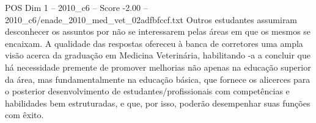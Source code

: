 \begin{textsample}{POS Dim 1 – 2010\_c6 – Score -2.00 – 2010\_c6/enade\_2010\_med\_vet\_02adfbfccf.txt}
Outros estudantes assumiram desconhecer os assuntos por não se interessarem pelas áreas em que os mesmos se encaixam.
A qualidade das respostas ofereceu à banca de corretores uma ampla visão acerca da graduação em Medicina Veterinária, habilitando -a a concluir que há necessidade premente de promover melhorias não apenas na educação superior da área, mas fundamentalmente na educação básica, que fornece os alicerces para o posterior desenvolvimento de estudantes/profissionais com competências e habilidades bem estruturadas, e que, por isso, poderão desempenhar suas funções com êxito.

\end{textsample}
